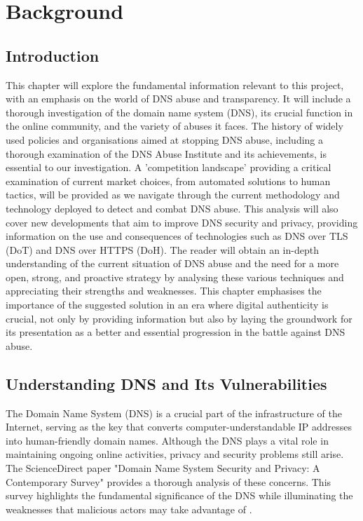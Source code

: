 \chapter{Background}
\label{Chapt2}
\section{Introduction}

This chapter will explore the fundamental information relevant to this project, with an emphasis on the world of DNS abuse and transparency. It will include a thorough investigation of the domain name system (DNS), its crucial function in the online community, and the variety of abuses it faces. The history of widely used policies and organisations aimed at stopping DNS abuse, including a thorough examination of the DNS Abuse Institute and its achievements, is essential to our investigation. A 'competition landscape' providing a critical examination of current market choices, from automated solutions to human tactics, will be provided as we navigate through the current methodology and technology deployed to detect and combat DNS abuse.  This analysis will also cover new developments that aim to improve DNS security and privacy, providing information on the use and consequences of technologies such as DNS over TLS (DoT) and DNS over HTTPS (DoH). The reader will obtain an in-depth understanding of the current situation of DNS abuse and the need for a more open, strong, and proactive strategy by analysing these various techniques and appreciating their strengths and weaknesses. This chapter emphasises the importance of the suggested solution in an era where digital authenticity is crucial, not only by providing information but also by laying the groundwork for its presentation as a better and essential progression in the battle against DNS abuse.

\section{Understanding DNS and Its Vulnerabilities}

The Domain Name System (DNS) is a crucial part of the infrastructure of the Internet, serving as the key that converts computer-understandable IP addresses into human-friendly domain names. Although the DNS plays a vital role in maintaining ongoing online activities, privacy and security problems still arise. The ScienceDirect paper "Domain Name System Security and Privacy: A Contemporary Survey" provides a thorough analysis of these concerns. This survey highlights the fundamental significance of the DNS while illuminating the weaknesses that malicious actors may take advantage of \cite*{sciencedirect2023dns}.

